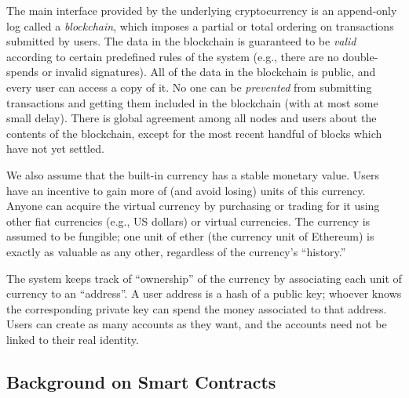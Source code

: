 \documentclass{llncs}
\newcommand{\ignore}[1]{}
\begin{document}
\ignore{We shall make some simplifying assumptions 
about the security model of the underlying cryptocurrency.
Loosely speaking, we assume that the
cryptocurrency has a secure and incentive compatible
consensus protocol. 
In reality, existing decentralized cryptocurrencies
achieve only heuristic security; designing a provably  
secure decentralized consensus protocol under
rationality assumptions is a topic of 
future research.
}

The main interface provided by the underlying cryptocurrency is an append-only log called a \emph{blockchain}, which imposes a partial or total ordering on transactions submitted by users. The data in the blockchain is guaranteed to be \emph{valid} according to certain predefined rules of the system (e.g., there are no double-spends or invalid signatures). All of the data in the blockchain is public, and every user can access a copy of it. No one can be \emph{prevented} from submitting transactions and getting them included in the blockchain (with at most some small delay). There is global agreement among all nodes and users about the contents of the blockchain,  except for the most recent handful of blocks which have not yet settled.

We also assume that the built-in currency has a stable monetary value. Users have an incentive to gain more of (and avoid losing) units of this currency. Anyone can acquire 
the virtual currency by purchasing or trading for it using 
other fiat currencies (e.g., US dollars) or virtual currencies. The currency is assumed to be fungible; one unit of ether (the currency unit of Ethereum) is exactly as valuable as any other, regardless of the currency's ``history.''

The system keeps track of ``ownership'' of the currency by associating each unit of currency to an ``address''. 
A user address is a hash of a public key; whoever knows the corresponding private key can spend the money associated to that address. Users can create as many accounts as they want, and the accounts need not be linked to their real identity.

\subsection{Background on Smart Contracts}
\end{document}
